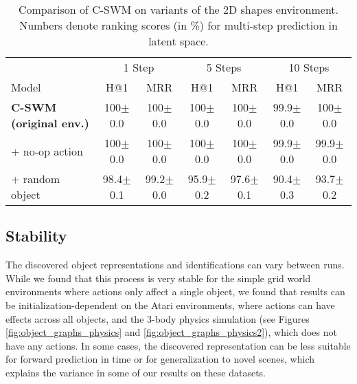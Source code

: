 \documentclass{article} %
\begin{document}
\begin{table}[htp!]
\centering
\caption{\label{tab:results_env_variants}Comparison of C-SWM on variants of the 2D shapes environment. Numbers denote ranking scores (in \%) for multi-step prediction in latent space.}
\begin{tabular}{lcccccc}
\toprule
   & \multicolumn{2}{c}{1 Step} & \multicolumn{2}{c}{5 Steps} & \multicolumn{2}{c}{10 Steps} \\ \cmidrule(lr){2-3} \cmidrule(lr){4-5} \cmidrule(lr){6-7}
Model & H@1 & MRR & H@1 & MRR & H@1 & MRR      \\ \midrule
{\bf C-SWM (original env.)}& 100{\color{lightgrey}\tiny$\pm$0.0}  & 100{\color{lightgrey}\tiny$\pm$0.0} & 100{\color{lightgrey}\tiny$\pm$0.0}  & 100{\color{lightgrey}\tiny$\pm$0.0} & 99.9{\color{lightgrey}\tiny$\pm$0.0}  & 100{\color{lightgrey}\tiny$\pm$0.0} \\
+ no-op action & 100{\color{lightgrey}\tiny$\pm$0.0}  & 100{\color{lightgrey}\tiny$\pm$0.0} & 100{\color{lightgrey}\tiny$\pm$0.0}  & 100{\color{lightgrey}\tiny$\pm$0.0} & 99.9{\color{lightgrey}\tiny$\pm$0.0}  & 99.9{\color{lightgrey}\tiny$\pm$0.0} \\
+ random object & 98.4{\color{lightgrey}\tiny$\pm$0.1}  & 99.2{\color{lightgrey}\tiny$\pm$0.0} & 95.9{\color{lightgrey}\tiny$\pm$0.2}  & 97.6{\color{lightgrey}\tiny$\pm$0.1} & 90.4{\color{lightgrey}\tiny$\pm$0.3}  & 93.7{\color{lightgrey}\tiny$\pm$0.2} \\
\bottomrule
\end{tabular}
\end{table}

\subsection{Stability}
The discovered object representations and identifications can vary between runs. While we found that this process is very stable for the simple grid world environments where actions only affect a single object, we found that results can be initialization-dependent on the Atari environments, where actions can have effects across all objects, and the 3-body physics simulation (see Figures \ref{fig:object_graphs_physics} and \ref{fig:object_graphs_physics2}), which does not have any actions. In some cases, the discovered representation can be less suitable for forward prediction in time or for generalization to novel scenes, which explains the variance in some of our results on these datasets.
\end{document}

